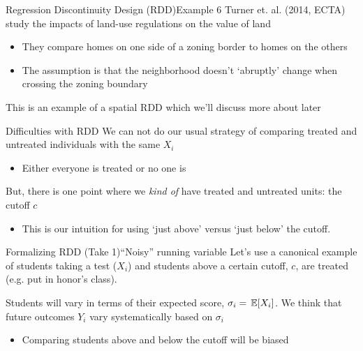 \documentclass[aspectratio=169,t,11pt,table]{beamer}
\begin{document}
\begin{frame}{Regression Discontinuity Design (RDD)}{Example 6}
  Turner et. al. (2014, ECTA) study the impacts of land-use regulations on the value of land
  \begin{itemize}
    \item They compare homes on one side of a zoning border to homes on the others
    \item The assumption is that the neighborhood doesn't `abruptly' change when crossing the zoning boundary
  \end{itemize}

  \bigskip 
  This is an example of a spatial RDD which we'll discuss more about later
\end{frame}

\begin{frame}{Difficulties with RDD}
  We can not do our usual strategy of comparing treated and untreated individuals with the same $X_i$
  \begin{itemize}
    \item Either everyone is treated or no one is
  \end{itemize}

  \bigskip
  But, there is one point where we \emph{kind of} have treated and untreated units: the cutoff $c$
  \begin{itemize}
    \item This is our intuition for using `just above' versus `just below' the cutoff.
  \end{itemize}
\end{frame}


\begin{frame}{Formalizing RDD (Take 1)}{``Noisy'' running variable}
  Let's use a canonical example of students taking a test ($X_i$) and students above a certain cutoff, $c$, are treated (e.g. put in honor's class).

  \bigskip
  Students will vary in terms of their expected score, $\sigma_i = \expec{X_i}$. We think that future outcomes $Y_i$ vary systematically based on $\sigma_i$
  \begin{itemize}
    \item Comparing students above and below the cutoff will be biased  
  \end{itemize}
\end{frame}
\end{document}
